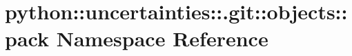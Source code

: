 \hypertarget{namespacepython_1_1uncertainties_1_1_8git_1_1objects_1_1pack}{
\section{python::uncertainties::.git::objects::pack Namespace Reference}
\label{namespacepython_1_1uncertainties_1_1_8git_1_1objects_1_1pack}
}
